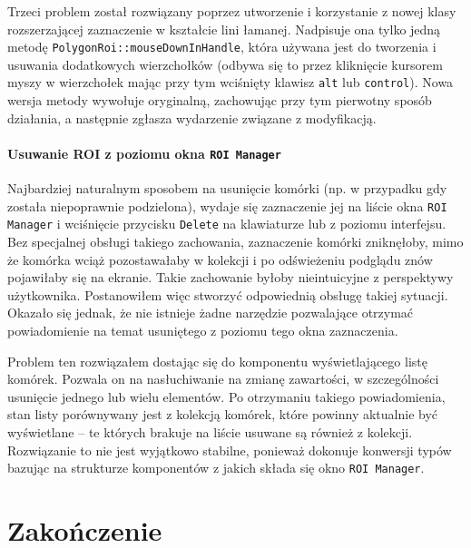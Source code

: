 \documentclass[declaration,shortabstract,mgr]{iithesis}
\begin{document}
Trzeci problem został rozwiązany poprzez utworzenie i korzystanie z nowej klasy rozszerzającej zaznaczenie w kształcie lini łamanej.
Nadpisuje ona tylko jedną metodę \texttt{PolygonRoi::mouseDownInHandle}, która używana jest do tworzenia i usuwania dodatkowych wierzchołków (odbywa się to przez kliknięcie kursorem myszy w wierzchołek mając przy tym wciśnięty klawisz \texttt{alt} lub \texttt{control}).
Nowa wersja metody wywołuje oryginalną, zachowując przy tym pierwotny sposób działania, a następnie zgłasza wydarzenie związane z modyfikacją.

\subsubsection{Usuwanie ROI z poziomu okna \texttt{ROI Manager}}

Najbardziej naturalnym sposobem na usunięcie komórki (np. w przypadku gdy została niepoprawnie podzielona), wydaje się zaznaczenie jej na liście okna \texttt{ROI Manager} i wciśnięcie przycisku \texttt{Delete} na klawiaturze lub z poziomu interfejsu.
Bez specjalnej obsługi takiego zachowania, zaznaczenie komórki zniknęłoby, mimo że komórka wciąż pozostawałaby w kolekcji i po odświeżeniu podglądu znów pojawiłaby się na ekranie.
Takie zachowanie byłoby nieintuicyjne z perspektywy użytkownika.
Postanowiłem więc stworzyć odpowiednią obsługę takiej sytuacji.
Okazało się jednak, że nie istnieje żadne narzędzie pozwalające otrzymać powiadomienie na temat usuniętego z poziomu tego okna zaznaczenia.

Problem ten rozwiązałem dostając się do komponentu wyświetlającego listę komórek.
Pozwala on na nasłuchiwanie na zmianę zawartości, w szczególności usunięcie jednego lub wielu elementów.
Po otrzymaniu takiego powiadomienia, stan listy porównywany jest z kolekcją komórek, które powinny aktualnie być wyświetlane -- te których brakuje na liście usuwane są również z kolekcji.
Rozwiązanie to nie jest wyjątkowo stabilne, ponieważ dokonuje konwersji typów bazując na strukturze komponentów z jakich składa się okno \texttt{ROI Manager}.



\chapter{Zakończenie}

\end{document}
